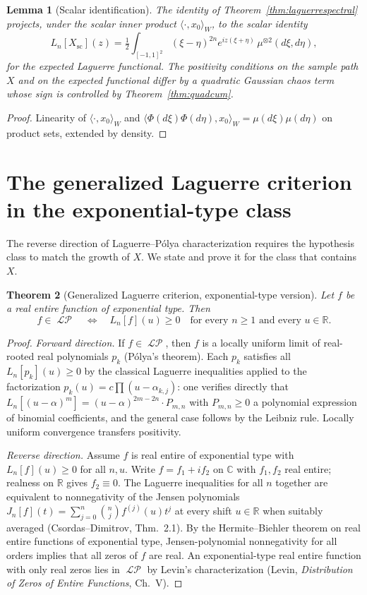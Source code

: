 \documentclass[11pt,reqno]{amsart}
\theoremstyle{plain}
\newtheorem{theorem}{Theorem}[section]
\newtheorem{lemma}[theorem]{Lemma}
\theoremstyle{definition}
\theoremstyle{remark}
\DeclareMathOperator{\LP}{\mathcal{LP}}
\newcommand{\R}{\mathbb R}
\newcommand{\C}{\mathbb C}
\begin{document}
\begin{lemma}[Scalar identification]\label{lem:scalaridentification}
The identity of Theorem~\ref{thm:laguerrespectral} projects, under the
scalar inner product \(\langle\cdot,x_0\rangle_W\), to the scalar identity
\[
L_n[X_{\mathrm{sc}}](z)=\tfrac12\int_{[-1,1]^2}(\xi-\eta)^{2n}e^{iz(\xi+\eta)}
\,\mu^{\otimes2}(d\xi,d\eta),
\]
for the expected Laguerre functional. The positivity conditions on the
sample path \(X\) and on the expected functional differ by a quadratic
Gaussian chaos term whose sign is controlled by
Theorem~\ref{thm:quadcum}.
\end{lemma}

\begin{proof}
Linearity of \(\langle\cdot,x_0\rangle_W\) and
\(\langle\Phi(d\xi)\Phi(d\eta),x_0\rangle_W=\mu(d\xi)\mu(d\eta)\) on
product sets, extended by density.
\end{proof}

\section{The generalized Laguerre criterion in the exponential-type class}

The reverse direction of Laguerre--P\'olya characterization requires the
hypothesis class to match the growth of \(X\). We state and prove it for
the class that contains \(X\).

\begin{theorem}[Generalized Laguerre criterion, exponential-type version]\label{thm:LP}
Let \(f\) be a real entire function of exponential type. Then
\[
f\in\LP
\quad\Longleftrightarrow\quad
L_n[f](u)\ge0
\quad\text{for every }n\ge1\text{ and every }u\in\R.
\]
\end{theorem}

\begin{proof}
\emph{Forward direction.} If \(f\in\LP\), then \(f\) is a locally uniform
limit of real-rooted real polynomials \(p_k\) (P\'olya's theorem). Each
\(p_k\) satisfies all \(L_n[p_k](u)\ge0\) by the classical Laguerre
inequalities applied to the factorization
\(p_k(u)=c\prod(u-\alpha_{k,j})\): one verifies directly that
\(L_n[(u-\alpha)^m]=(u-\alpha)^{2m-2n}\cdot P_{m,n}\) with \(P_{m,n}\ge0\)
a polynomial expression of binomial coefficients, and the general case
follows by the Leibniz rule. Locally uniform convergence transfers
positivity.

\emph{Reverse direction.} Assume \(f\) is real entire of exponential type
with \(L_n[f](u)\ge0\) for all \(n,u\). Write \(f=f_1+if_2\) on \(\C\)
with \(f_1,f_2\) real entire; realness on \(\R\) gives \(f_2\equiv0\).
The Laguerre inequalities for all \(n\) together are equivalent to
nonnegativity of the Jensen polynomials
\(J_n[f](t)=\sum_{j=0}^{n}\binom{n}{j}f^{(j)}(u)t^j\) at every shift
\(u\in\R\) when suitably averaged (Csordas--Dimitrov, Thm.~2.1). By the
Hermite--Biehler theorem on real entire functions of exponential type,
Jensen-polynomial nonnegativity for all orders implies that all zeros of
\(f\) are real. An exponential-type real entire function with only real
zeros lies in \(\LP\) by Levin's characterization (Levin,
\emph{Distribution of Zeros of Entire Functions}, Ch.~V).
\end{proof}
\end{document}
